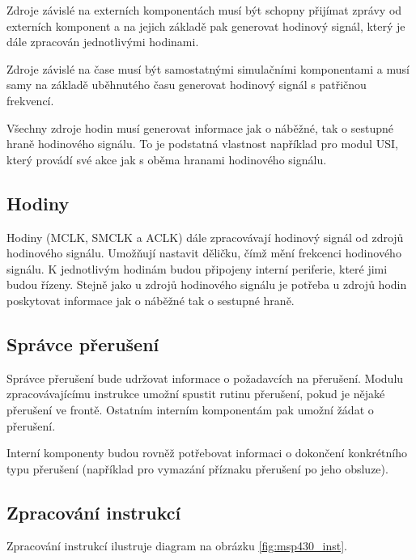 Zdroje závislé na externích komponentách musí být schopny přijímat zprávy od externích komponent a na jejich základě pak generovat hodinový signál, který je dále zpracován jednotlivými hodinami.

Zdroje závislé na čase musí být samostatnými simulačními komponentami a musí samy na základě uběhnutého času generovat hodinový signál s patřičnou frekvencí.

Všechny zdroje hodin musí generovat informace jak o náběžné, tak o sestupné hraně hodinového signálu. To je podstatná vlastnost například pro modul USI, který provádí své akce jak s oběma hranami hodinového signálu.

\subsection{Hodiny}

Hodiny (MCLK, SMCLK a ACLK) dále zpracovávají hodinový signál od zdrojů hodinového signálu. Umožňují nastavit děličku, čímž mění frekcenci hodinového signálu. K jednotlivým hodinám budou připojeny interní periferie, které jimi budou řízeny. Stejně jako u zdrojů hodinového signálu je potřeba u zdrojů hodin poskytovat informace jak o náběžné tak o sestupné hraně.

\subsection{Správce přerušení}

Správce přerušení bude udržovat informace o požadavcích na přerušení. Modulu zpracovávajícímu instrukce umožní spustit rutinu přerušení, pokud je nějaké
přerušení ve frontě. Ostatním interním komponentám pak umožní žádat o přerušení.

Interní komponenty budou rovněž potřebovat informaci o dokončení konkrétního typu přerušení (například pro vymazání příznaku přerušení po jeho obsluze).

\subsection{Zpracování instrukcí}

Zpracování instrukcí ilustruje diagram na obrázku \ref{fig:msp430_inst}.

